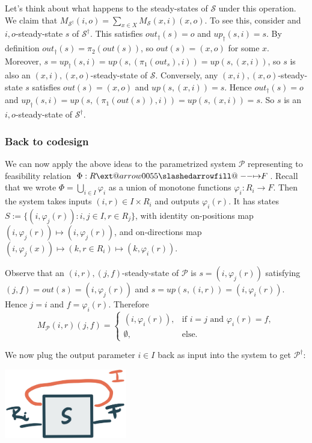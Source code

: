 \documentclass[12pt, a4paper]{article}
\makeatletter
\theoremstyle{definition}
\theoremstyle{plain}
\theoremstyle{plain}
\theoremstyle{plain}
\theoremstyle{plain}
\theoremstyle{plain}
\theoremstyle{remark}
\theoremstyle{remark}
\newcommand{\mc}[1]{\mathcal{#1}}
\def\slashedarrowfill@#1#2#3#4#5{%
	$\m@th\thickmuskip0mu\medmuskip\thickmuskip\thinmuskip\thickmuskip
	\relax#5#1\mkern-7mu%
	\cleaders\hbox{$#5\mkern-2mu#2\mkern-2mu$}\hfill
	\mathclap{#3}\mathclap{#2}%
	\cleaders\hbox{$#5\mkern-2mu#2\mkern-2mu$}\hfill
	\mkern-7mu#4$%
}
\def\rightslashedarrowfill@{%
	\slashedarrowfill@\relbar\relbar\mapstochar\rightarrow}
\newcommand\xslashedrightarrow[2][]{%
	\ext@arrow 0055{\rightslashedarrowfill@}{#1}{#2}}
\newcommand{\prof}{\xslashedrightarrow{}}
\makeatother
\begin{document}
Let's think about what happens to the steady-states of $\mc{S}$ under this operation. We claim that $M_{\mc{S}^\dagger}(i,o) = \sum_{x \in X} M_{\mc{S}}(x,i)(x,o)$. To see this, consider and $i,o$-steady-state $s$ of $\mc{S}^\dagger$. This satisfies $out_\dagger(s) = o$ and $up_\dagger(s,i) = s$. By definition $out_\dagger(s) = \pi_2(out(s))$, so $out(s) = (x,o)$ for some $x$. Moreover, $s = up_\dagger(s,i) = up(s,(\pi_1(out_s),i)) = up(s,(x,i))$, so $s$ is also an $(x,i),(x,o)$-steady-state of $\mc{S}$. Conversely, any $(x,i),(x,o)$-steady-state $s$ satisfies $out(s) = (x,o)$ and $up(s,(x,i)) = s$. Hence $out_\dagger(s) = o$ and $up_\dagger(s,i) = up(s,(\pi_1(out(s)),i)) = up(s,(x,i)) = s$. So $s$ is an $i,o$-steady-state of $\mc{S}^\dagger$. 

\subsubsection{Back to codesign}
We can now apply the above ideas to the parametrized system $\mc{P}$ representing to feasibility relation $\Phi: R \prof F$. Recall that we wrote $\Phi = \bigcup_{i \in I} \varphi_i$ as a union of monotone functions $\varphi_i \colon R_i \rightarrow F$. Then the system takes inputs $(i, r) \in I \times R_i$ and outputs $\varphi_i(r)$. It has states $S := \{ (i,\varphi_j(r)) : i,j \in I, r \in R_j \}$, with identity on-positions map $(i,\varphi_j(r)) \mapsto (i,\varphi_j(r))$, and on-directions map $(i,\varphi_j(x))\mapsto (k,r \in R_i) \mapsto (k,\varphi_i(r))$.

Observe that an $(i,r),(j,f)$-steady-state of $\mc{P}$ is $s = (i,\varphi_j(r))$ satisfying $(j,f) = out(s) = (i,\varphi_j(r))$ and $s = up(s,(i,r)) = (i,\varphi_i(r))$. Hence $j=i$ and $f = \varphi_i(r)$. Therefore
$$M_\mc{P}(i,r)(j,f) = \begin{cases} (i,\varphi_i(r)), & \text{if } i=j \text{ and } \varphi_i(r) = f, \\ \emptyset, & \text{else.} \end{cases} $$

We now plug the output parameter $i \in I$ back as input into the system to get $\mc{P}^\dagger$:
\begin{center}
	\includegraphics[width = 0.4\textwidth]{parameter-trace.jpg}
\end{center}
\end{document}
